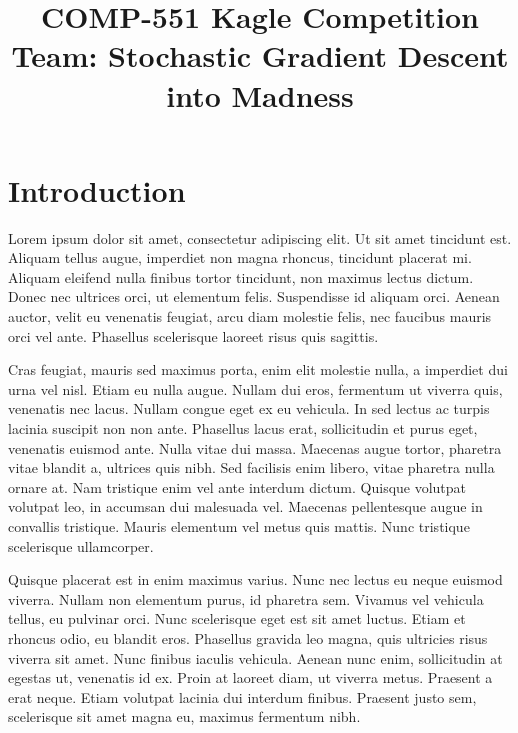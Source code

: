\documentclass[conference]{IEEEtran}
\begin{document}
\title{COMP-551 Kagle Competition\\
{\Large Team: Stochastic Gradient Descent into Madness}
}

\author{
\and
{}
\and
{}
}

\maketitle

\section{Introduction}

Lorem ipsum dolor sit amet, consectetur adipiscing elit. Ut sit amet tincidunt est. Aliquam tellus augue, imperdiet non magna rhoncus, tincidunt placerat mi. Aliquam eleifend nulla finibus tortor tincidunt, non maximus lectus dictum. Donec nec ultrices orci, ut elementum felis. Suspendisse id aliquam orci. Aenean auctor, velit eu venenatis feugiat, arcu diam molestie felis, nec faucibus mauris orci vel ante. Phasellus scelerisque laoreet risus quis sagittis.

Cras feugiat, mauris sed maximus porta, enim elit molestie nulla, a imperdiet dui urna vel nisl. Etiam eu nulla augue. Nullam dui eros, fermentum ut viverra quis, venenatis nec lacus. Nullam congue eget ex eu vehicula. In sed lectus ac turpis lacinia suscipit non non ante. Phasellus lacus erat, sollicitudin et purus eget, venenatis euismod ante. Nulla vitae dui massa. Maecenas augue tortor, pharetra vitae blandit a, ultrices quis nibh. Sed facilisis enim libero, vitae pharetra nulla ornare at. Nam tristique enim vel ante interdum dictum. Quisque volutpat volutpat leo, in accumsan dui malesuada vel. Maecenas pellentesque augue in convallis tristique. Mauris elementum vel metus quis mattis. Nunc tristique scelerisque ullamcorper.

Quisque placerat est in enim maximus varius. Nunc nec lectus eu neque euismod viverra. Nullam non elementum purus, id pharetra sem. Vivamus vel vehicula tellus, eu pulvinar orci. Nunc scelerisque eget est sit amet luctus. Etiam et rhoncus odio, eu blandit eros. Phasellus gravida leo magna, quis ultricies risus viverra sit amet. Nunc finibus iaculis vehicula. Aenean nunc enim, sollicitudin at egestas ut, venenatis id ex. Proin at laoreet diam, ut viverra metus. Praesent a erat neque. Etiam volutpat lacinia dui interdum finibus. Praesent justo sem, scelerisque sit amet magna eu, maximus fermentum nibh.
\end{document}
